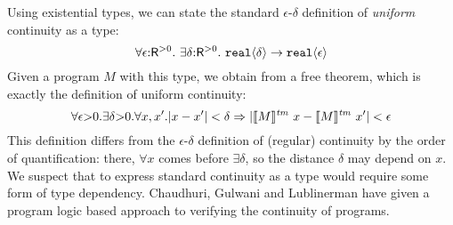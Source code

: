 \begin{example}
Using %
existential types, %
we can
  state the standard 
$\epsilon$-$\delta$ definition of
  \emph{uniform} continuity as a type:
  \begin{displaymath}
    \forall \epsilon \mathord: \mathsf{R}^{>0}.\ \exists \delta\mathord: \mathsf{R}^{>0}.\ \textup{\texttt{real}}\langle \delta \rangle \to \textup{\texttt{real}}\langle \epsilon \rangle
  \end{displaymath}
  Given a program $M$ with this type, we obtain from
   a free theorem, which is exactly the
  definition of uniform continuity:
  \begin{displaymath}
    \forall \epsilon \mathord> 0. \exists \delta \mathord> 0. \forall x,x'. |x - x'| < \delta \Rightarrow |\llbracket M \rrbracket^{\mathit{tm}}\ x - \llbracket M \rrbracket^{\mathit{tm}}\ x'| < \epsilon
  \end{displaymath}
  This definition differs from the $\epsilon$-$\delta$
  definition of (regular) continuity by the order of quantification: 
  there, $\forall x$ comes before $\exists \delta$, so 
  the distance 
  $\delta$ may depend on %
  $x$. We suspect that to
  express standard continuity as a type would require some form of
  type dependency. Chaudhuri, Gulwani and Lublinerman
  \cite{chaudhuri10continuity} have given a program logic based
  approach to verifying the continuity of programs.
\end{example}












